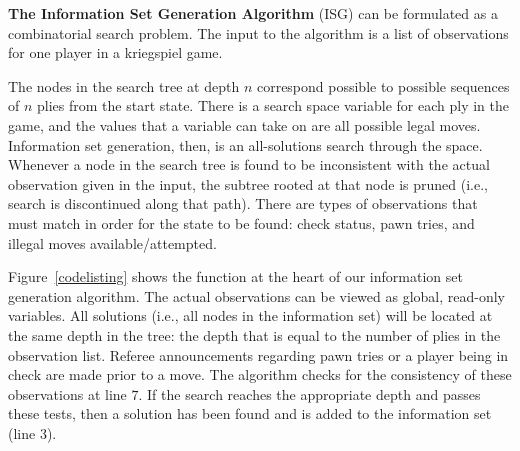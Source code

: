 \documentclass[times, 10pt,twocolumn]{article}
\begin{document}

   
\textbf{The Information Set Generation Algorithm}
(ISG) can be formulated as a combinatorial search problem.  The input to the algorithm is a list
of observations for one player in a kriegspiel game.    

The nodes in the search tree at depth $n$ correspond possible to possible sequences of $n$ plies from the start state.
There is a search space variable for each ply in the game, and the values that a variable can take on are all possible
legal moves.  Information set generation, then, is an all-solutions search through the space.  Whenever a node in the search tree is
found to be inconsistent with the actual observation given in the input, the
subtree rooted at that node is pruned (i.e., search is discontinued along that
path).  There are types of observations that must match in order for the state
to be found: check status, pawn tries, and illegal moves available/attempted.

Figure~\ref{codelisting} shows the function at the heart of our information set generation algorithm.  The actual
observations can be viewed as global, read-only variables.  All solutions (i.e., all nodes in the information set) will
be located at the same depth in the tree: the depth that is equal to the number of plies in the observation list.
Referee announcements regarding pawn tries or a player being in check are made prior to a move.  The algorithm checks
for the consistency of these observations at line $7$.  If the search reaches the appropriate depth and passes these
tests, then a solution has been found and is added to the information set (line $3$).  
\end{document}

